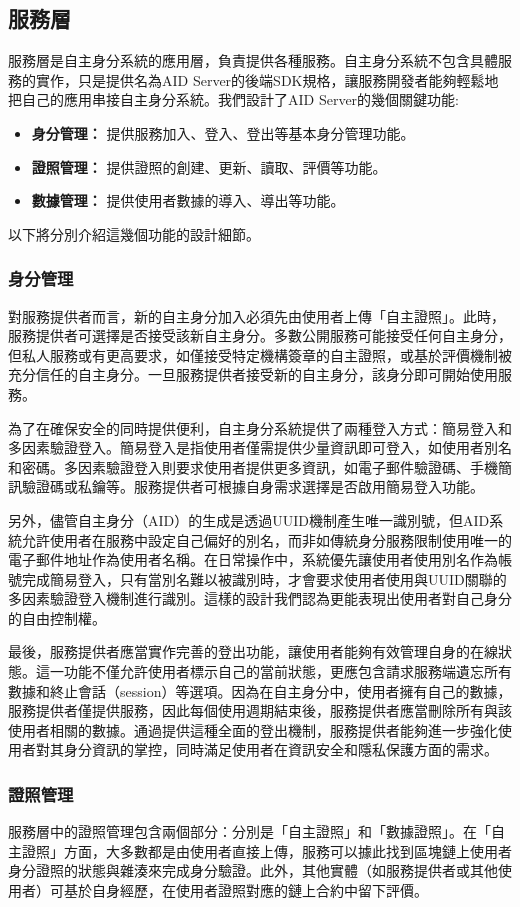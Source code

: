 \subsection{服務層}
服務層是自主身分系統的應用層，負責提供各種服務。自主身分系統不包含具體服務的實作，只是提供名為AID Server的後端SDK規格，讓服務開發者能夠輕鬆地把自己的應用串接自主身分系統。我們設計了AID Server的幾個關鍵功能:
\begin{itemize}
  \item \textbf{身分管理：} 提供服務加入、登入、登出等基本身分管理功能。
  \item \textbf{證照管理：} 提供證照的創建、更新、讀取、評價等功能。
  \item \textbf{數據管理：} 提供使用者數據的導入、導出等功能。
\end{itemize}
以下將分別介紹這幾個功能的設計細節。
\subsubsection{身分管理}
對服務提供者而言，新的自主身分加入必須先由使用者上傳「自主證照」。此時，服務提供者可選擇是否接受該新自主身分。多數公開服務可能接受任何自主身分，但私人服務或有更高要求，如僅接受特定機構簽章的自主證照，或基於評價機制被充分信任的自主身分。一旦服務提供者接受新的自主身分，該身分即可開始使用服務。

為了在確保安全的同時提供便利，自主身分系統提供了兩種登入方式：簡易登入和多因素驗證登入。簡易登入是指使用者僅需提供少量資訊即可登入，如使用者別名和密碼。多因素驗證登入則要求使用者提供更多資訊，如電子郵件驗證碼、手機簡訊驗證碼或私鑰等。服務提供者可根據自身需求選擇是否啟用簡易登入功能。

另外，儘管自主身分（AID）的生成是透過UUID機制\cite{uuid}產生唯一識別號，但AID系統允許使用者在服務中設定自己偏好的別名，而非如傳統身分服務限制使用唯一的電子郵件地址作為使用者名稱。在日常操作中，系統優先讓使用者使用別名作為帳號完成簡易登入，只有當別名難以被識別時，才會要求使用者使用與UUID關聯的多因素驗證登入機制進行識別。這樣的設計我們認為更能表現出使用者對自己身分的自由控制權。

最後，服務提供者應當實作完善的登出功能，讓使用者能夠有效管理自身的在線狀態。這一功能不僅允許使用者標示自己的當前狀態，更應包含請求服務端遺忘所有數據和終止會話（session）等選項。因為在自主身分中，使用者擁有自己的數據，服務提供者僅提供服務，因此每個使用週期結束後，服務提供者應當刪除所有與該使用者相關的數據。通過提供這種全面的登出機制，服務提供者能夠進一步強化使用者對其身分資訊的掌控，同時滿足使用者在資訊安全和隱私保護方面的需求。
\subsubsection{證照管理}
服務層中的證照管理包含兩個部分：分別是「自主證照」和「數據證照」。在「自主證照」方面，大多數都是由使用者直接上傳，服務可以據此找到區塊鏈上使用者身分證照的狀態與雜湊來完成身分驗證。此外，其他實體（如服務提供者或其他使用者）可基於自身經歷，在使用者證照對應的鏈上合約中留下評價。

